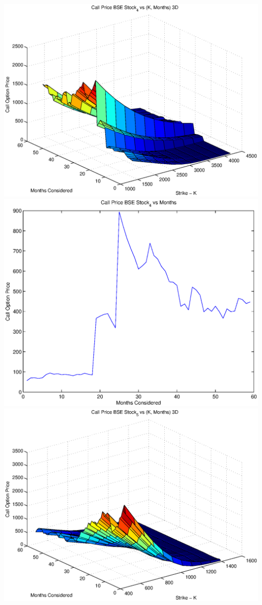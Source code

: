 \documentclass{article}
\begin{document}
\includegraphics[width=\textwidth]{Call_Price_BSE_Stock_4_vs_(K,_Months)_3D} \\

\includegraphics[width=\textwidth]{Call_Price_BSE_Stock_4_vs_Months} \\

\includegraphics[width=\textwidth]{Call_Price_BSE_Stock_5_vs_(K,_Months)_3D} \\
\end{document}
